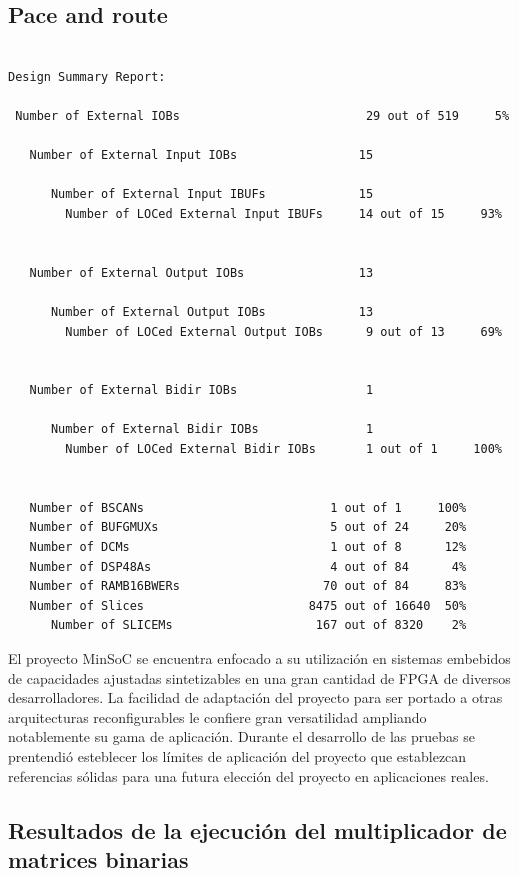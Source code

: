 		\subsection{Pace and route}	
\begin{lstlisting}[frame=single,caption={Resultado de PAR},label={lst:salidas},breaklines]

Design Summary Report:

 Number of External IOBs                          29 out of 519     5%

   Number of External Input IOBs                 15

      Number of External Input IBUFs             15
        Number of LOCed External Input IBUFs     14 out of 15     93%


   Number of External Output IOBs                13

      Number of External Output IOBs             13
        Number of LOCed External Output IOBs      9 out of 13     69%


   Number of External Bidir IOBs                  1

      Number of External Bidir IOBs               1
        Number of LOCed External Bidir IOBs       1 out of 1     100%


   Number of BSCANs                          1 out of 1     100%
   Number of BUFGMUXs                        5 out of 24     20%
   Number of DCMs                            1 out of 8      12%
   Number of DSP48As                         4 out of 84      4%
   Number of RAMB16BWERs                    70 out of 84     83%
   Number of Slices                       8475 out of 16640  50%
      Number of SLICEMs                    167 out of 8320    2%
\end{lstlisting}

	El proyecto MinSoC se encuentra enfocado a su utilización en sistemas embebidos de capacidades ajustadas sintetizables en una gran cantidad de FPGA
	de diversos desarrolladores. La facilidad de adaptación del proyecto para ser portado a otras arquitecturas reconfigurables le confiere gran
	versatilidad ampliando notablemente su gama de aplicación.
	Durante el desarrollo de las pruebas se prentendió esteblecer los límites de aplicación del proyecto que establezcan referencias sólidas para una
	futura elección del proyecto en aplicaciones reales.

		\subsection{Resultados de la ejecución del multiplicador de matrices binarias}
		
